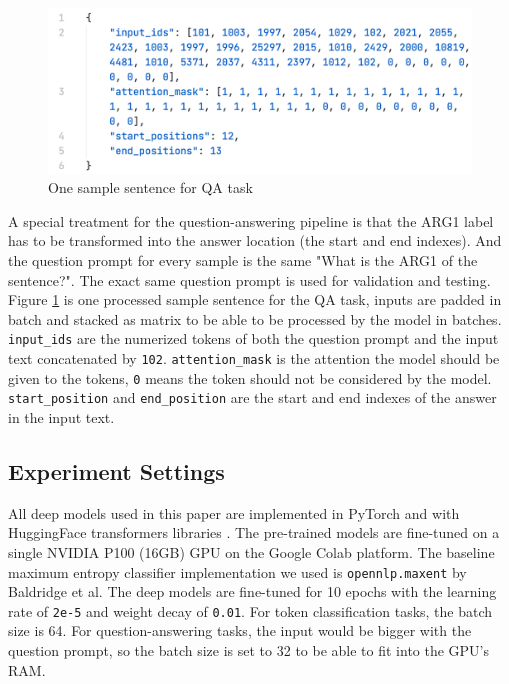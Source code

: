 \documentclass[11pt]{article}
\begin{document}
\begin{figure}[h]
  \centering
  \includegraphics[width=\linewidth]{assets/dataset-one-qa-sample.png}
  \caption{One sample sentence for QA task}
  \label{fig:dataset-one-qa-sample}
\end{figure}

A special treatment for the question-answering pipeline is that the ARG1 label has to be transformed into the answer location (the start and end indexes). And the question prompt for every sample is the same "What is the ARG1 of the sentence?". The exact same question prompt is used for validation and testing. Figure \ref{fig:dataset-one-qa-sample} is one processed sample sentence for the QA task, inputs are padded in batch and stacked as matrix to be able to be processed by the model in batches. \verb|input_ids| are the numerized tokens of both the question prompt and the input text concatenated by \verb|102|. \verb|attention_mask| is the attention the model should be given to the tokens, \verb|0| means the token should not be considered by the model. \verb|start_position| and \verb|end_position| are the start and end indexes of the answer in the input text.


\subsection{Experiment Settings}

All deep models used in this paper are implemented in PyTorch and with HuggingFace transformers libraries \cite{wolf2019huggingface}. The pre-trained models are fine-tuned on a single NVIDIA P100 (16GB) GPU on the Google Colab platform. The baseline maximum entropy classifier implementation we used is \verb|opennlp.maxent| by Baldridge et al. The deep models are fine-tuned for 10 epochs with the learning rate of \verb|2e-5| and weight decay of \verb|0.01|. For token classification tasks, the batch size is 64. For question-answering tasks, the input would be bigger with the question prompt, so the batch size is set to 32 to be able to fit into the GPU's RAM.
\end{document}
